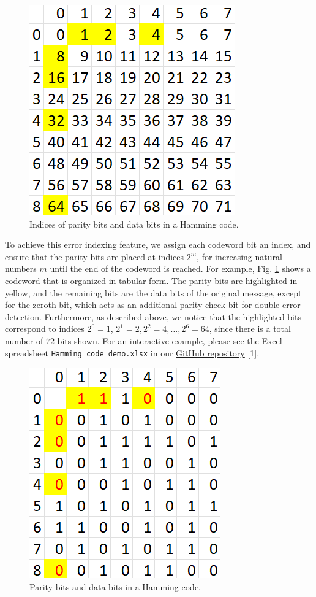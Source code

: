 \documentclass[conference]{IEEEtran}
\begin{document}
\begin{figure}[htbp]
  \centerline{\includegraphics{Images/Hamming_bits_order.png}}
  \caption{Indices of parity bits and data bits in a Hamming code.}
  \label{fig_3}
\end{figure}

To achieve this error indexing feature, we assign each codeword bit an index,
and ensure that the parity bits are placed at indices $2^m$, for increasing natural numbers $m$ until the end of the codeword is reached.
For example, Fig. \ref{fig_3} shows a codeword that is organized in tabular form.
The parity bits are highlighted in yellow, and the remaining bits are the data bits of the original message, except for the zeroth bit, which acts as an additional parity check bit for double-error detection.
Furthermore, as described above, we notice that the highlighted bits correspond to indices $2^0 = 1$, $2^1 = 2, 2^2 = 4, \ldots, 2^6 = 64$, since there is a total number of $72$ bits shown.
For an interactive example, please see the Excel spreadsheet \verb+Hamming_code_demo.xlsx+ in our \href{https://github.com/luckunately/ELEC433-Projects}{GitHub repository} [1].

\begin{figure}[htbp]
  \centerline{\includegraphics{Images/Hamming_example.png}}
  \caption{Parity bits and data bits in a Hamming code.}
  \label{fig_2}
\end{figure}
\end{document}
